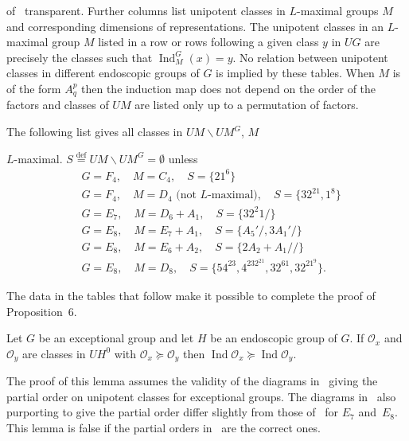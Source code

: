 \documentclass{amsart}
\newenvironment{cthm}[1]
  {\renewcommand\thethm{\sc #1}\thm}
  {\endthm}
\newcommand\Ind	{\operatorname{Ind}}
\newcommand\cO		{{\mathcal O}}
\begin{document}
of~\cite{AL} transparent.  Further columns list unipotent classes
in 
$L$-maximal groups $M$ and corresponding dimensions of
representations.
The unipotent classes in an $L$-maximal group $M$ listed in a row
or 
rows following a given
class $y$ in $UG$ are precisely the classes such that
$\Ind_M^G(x) = y$.
No relation between unipotent classes in different endoscopic
groups of $G$
is implied by these tables.  When $M$ is of the form $A_q^p$ then
the 
induction map does not depend on the order of the factors and
classes of $UM$
are listed only up to a permutation of factors.

The following list gives all classes in $UM \backslash UM^G$, $M$

$L$-maximal.  \newline
$S \overset {\text{def}}{=} UM \backslash UM^G = \emptyset$
unless    
     \begin{align*}
     &G = F_4, \quad M = C_4, \quad S = \{ 21^6 \} \\
     &G = F_4, \quad M = D_4 \text{ (not $L$-maximal)}, 
          \quad S = \{ 32^21, 1^8 \} \\
     &G = E_7, \quad M = D_6 + A_1, \quad S = \{ 32^2 1 / \} \\
     &G = E_8, \quad M = E_7 + A_1, \quad S = \{ A_5'/, 3A_1'/ \}
\\
     &G = E_8, \quad M = E_6 + A_2, \quad S = \{ 2A_2 + A_1// \}
\\
     &G = E_8, \quad M = D_8, \quad S = \{ 54^23, 4^232^21,
32^61, 32^21^9 \}.
     \end{align*}

The data in the tables that follow make it possible to complete
the proof
of Proposition~6.

\begin{cthm}{Lemma~1} Let $G$ be an exceptional group and let $H$ be
an
     endoscopic group of $G$.  If $\cO_x$ and $\cO_y$ are classes
in $UH^0$
     with $\cO_x \succeq \cO_y$ then $\Ind \cO_x \succeq \Ind \cO_y$.
     \end{cthm}
     
\begin{cthm}{Remark} The proof of this lemma assumes the validity of the
diagrams
in~\cite{Sp} giving the partial order on unipotent classes for
exceptional
groups.  The diagrams in~\cite{C} also purporting to give the
partial order
differ slightly from those of~\cite{Sp} for $E_7$ and~$E_8$. 
This lemma
is false if the partial orders in~\cite{C} are the correct ones.
\end{cthm}
\end{document}
